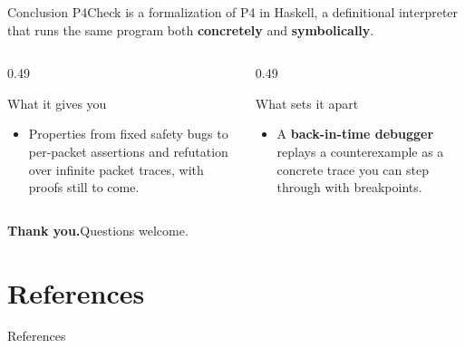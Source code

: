 \begin{frame}{Conclusion}
  \vspace{0.2em}
  P4Check is a formalization of P4 in Haskell, a definitional interpreter that
  runs the same program both \textbf{concretely} and \textbf{symbolically}.

  \vspace{0.6em}
  \begin{columns}[T,onlytextwidth]
    \begin{column}{0.49\textwidth}
      \begin{block}{What it gives you}
        \small
        \begin{itemize}\setlength\itemsep{4pt}
          \item[\textcolor{palOlivine!60!black}{\checkmark}]
                Properties from fixed safety bugs to per-packet assertions and
                \textbf{\LTL{}} refutation over infinite packet traces, with
                proofs still to come.
        \end{itemize}
      \end{block}
    \end{column}
    \begin{column}{0.49\textwidth}
      \begin{block}{What sets it apart}
        \small
        \begin{itemize}\setlength\itemsep{4pt}
          \item[\textcolor{palCoral!75!black}{\textbf{!}}]
                A \textbf{back-in-time debugger} replays a counterexample as a
                concrete trace you can step through with breakpoints.
        \end{itemize}
      \end{block}
    \end{column}
  \end{columns}

  \vspace{0.4em}
  \centering
  {\large\textbf{Thank you.}}\quad\textcolor{palGray}{Questions welcome.}
\end{frame}

\appendix

\section{References}

{%
\begin{frame}[allowframebreaks]{References}
  \footnotesize
  \printbibliography[heading=none]
\end{frame}}


